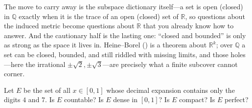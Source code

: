 \documentclass[main.tex]{subfiles}
\begin{document}
\begin{Reflection}
The move to carry away is the subspace dictionary itself---a set is open (closed) in $\mathbb Q$
exactly when it is the trace of an open (closed) set of $\mathbb R$, so questions about the induced
metric become questions about $\mathbb R$ that you already know how to answer. And the cautionary half
is the lasting one: ``closed and bounded'' is only as strong as the space it lives in. Heine--Borel
() is a theorem about $\mathbb R^k$; over $\mathbb Q$ a set can be closed, bounded, and
still riddled with missing limits, and those holes---here the irrational $\pm\sqrt2,\pm\sqrt3$---are
precisely what a finite subcover cannot corner.
\end{Reflection}

Let $E$ be the set of all $x\in[0,1]$ whose decimal expansion contains only the digits $4$ and $7$.
Is $E$ countable? Is $E$ dense in $[0,1]$? Is $E$ compact? Is $E$ perfect?
\end{document}
